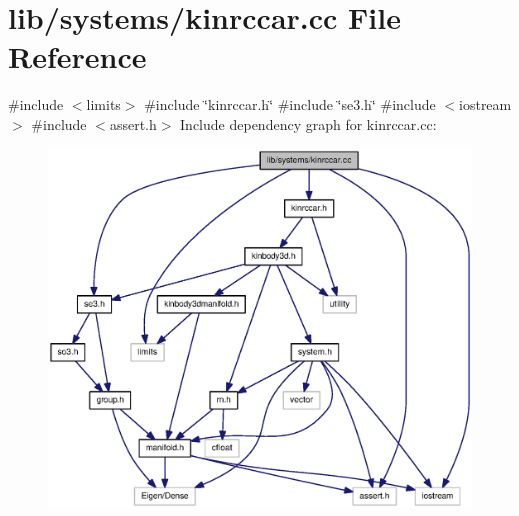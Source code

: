 \section{lib/systems/kinrccar.cc \-File \-Reference}
\label{kinrccar_8cc}
{\ttfamily \#include $<$limits$>$}\*
{\ttfamily \#include \char`\"{}kinrccar.\-h\char`\"{}}\*
{\ttfamily \#include \char`\"{}se3.\-h\char`\"{}}\*
{\ttfamily \#include $<$iostream$>$}\*
{\ttfamily \#include $<$assert.\-h$>$}\*
\-Include dependency graph for kinrccar.\-cc\-:\nopagebreak
\begin{figure}[H]
\begin{center}
\leavevmode
\includegraphics[width=350pt]{kinrccar_8cc__incl}
\end{center}
\end{figure}
